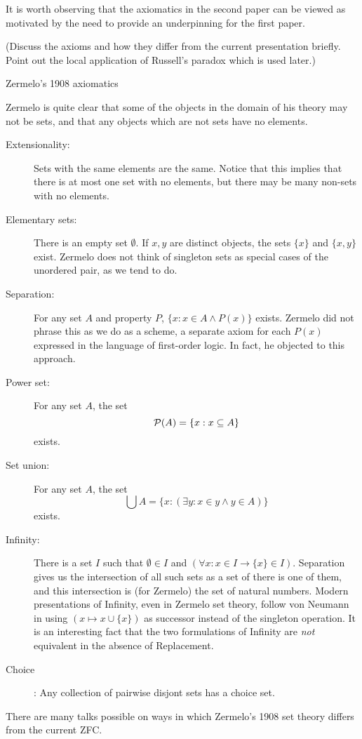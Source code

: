 \documentclass{slides}
\begin{document}
\begin{slide}
It is worth observing that the axiomatics in the second paper can be viewed as motivated by the need to provide an underpinning for the first paper.

(Discuss the axioms and how they differ from the current presentation briefly.  Point out the local application of Russell's paradox which is used later.)
\end{slide}

\begin{slide}

{\Large Zermelo's 1908 axiomatics}

Zermelo is quite clear that some of the objects in the domain of his theory may not be sets, and that any  objects which are not sets have no elements.

\begin{description}

\item[Extensionality:]  Sets with the same elements are the same.  Notice that this implies that there is at most one set with no elements, but there may be many non-sets with no elements.

\item[Elementary sets:]  There is an empty set $\emptyset$.  If $x,y$ are distinct objects, the sets $\{x\}$ and $\{x,y\}$ exist.  Zermelo does not think of singleton sets as special cases of the unordered pair, as we tend to do.

\item[Separation:]  For any set $A$ and property $P$, $\{x : x \in A \wedge P(x)\}$ exists.   Zermelo did not phrase this as we do as a scheme, a separate axiom for each
$P(x)$ expressed in the language of first-order logic.  In fact, he objected to this approach.

\item[Power set:]  For any set $A$, the set $${\cal P}(A)=\{x : x \subseteq A\}$$ exists.

\item[Set union:]  For any set $A$, the set $$\bigcup A = \{x:(\exists y:x \in y \wedge y \in A)\}$$ exists.

\item[Infinity:]  There is a set $I$ such that $\emptyset \in I$ and $(\forall x:x \in I \rightarrow \{x\} \in I)$.  Separation gives us the intersection of all such sets as a set of there is one of them, and this intersection is (for Zermelo) the set of natural numbers.  Modern presentations of Infinity, even in Zermelo set theory, follow von Neumann in using $(x \mapsto x \cup \{x\})$ as successor instead of the singleton operation.  It is an interesting fact that the two formulations of Infinity are {\em not\/} equivalent in the absence of Replacement.

\item[Choice]:  Any collection of pairwise disjont sets has a choice set.

\end{description}

There are many talks possible on ways in which Zermelo's 1908 set theory differs from the current ZFC.

\end{slide}
\end{document}
